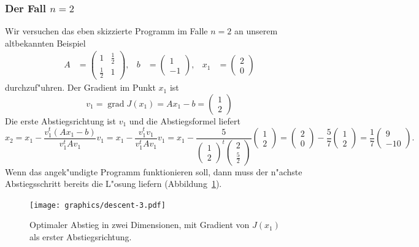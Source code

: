 \subsubsection{Der Fall $n=2$}
Wir versuchen das eben skizzierte Programm im Falle $n=2$ an unserem
altbekannten Beispiel
\begin{align*}
A&=\begin{pmatrix}1&\frac12\\\frac12&1\end{pmatrix},&
b&=\begin{pmatrix}1\\-1\end{pmatrix},&
x_1&=\begin{pmatrix}2\\0\end{pmatrix}
\end{align*}
durchzuf"uhren. Der Gradient im Punkt $x_1$ ist
\[
v_1=\operatorname{grad}J(x_1)=Ax_1-b=\begin{pmatrix}1\\2\end{pmatrix}
\]
Die erste Abstiegsrichtung ist $v_1$ und die Abstiegsformel liefert
\[
x_2
=
x_1-\frac{v_1^t(Ax_1-b)}{v_1^tAv_1}v_1
=
x_1-\frac{v_1^tv_1}{v_1^tAv_1}v_1
=x_1-\frac{5}{\begin{pmatrix}1\\2\end{pmatrix}^t\begin{pmatrix}2\\\frac52\end{pmatrix}}\begin{pmatrix}1\\2\end{pmatrix}
=\begin{pmatrix}2\\0 \end{pmatrix}
-\frac57\begin{pmatrix}1\\2\end{pmatrix}
=\frac17\begin{pmatrix}9\\-10\end{pmatrix}.
\]
Wenn das angek"undigte Programm funktionieren soll, dann muss der n"achste
Abstiegsschritt bereits die L"osung liefern (Abbildung~\ref{descent3}).
\begin{figure}
\begin{center}
\texttt{[image: graphics/descent-3.pdf]}
\end{center}
\caption{Optimaler Abstieg in zwei Dimensionen, mit Gradient von $J(x_1)$
als erster Abstiegsrichtung.
\label{descent3}}
\end{figure}
